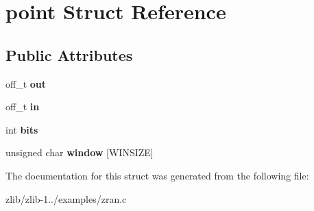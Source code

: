 \hypertarget{structpoint}{\section{point Struct Reference}
\label{structpoint}
}
\subsection*{Public Attributes}
\begin{DoxyCompactItemize}
\item 
\hypertarget{structpoint_abcfd4d3772b23166cd062d3d266c136d}{off\+\_\+t {\bfseries out}}\label{structpoint_abcfd4d3772b23166cd062d3d266c136d}

\item 
\hypertarget{structpoint_a16081c689cb453c89d844ffc88a7a211}{off\+\_\+t {\bfseries in}}\label{structpoint_a16081c689cb453c89d844ffc88a7a211}

\item 
\hypertarget{structpoint_ab8eed5134882b57585186317509c108d}{int {\bfseries bits}}\label{structpoint_ab8eed5134882b57585186317509c108d}

\item 
\hypertarget{structpoint_aa1c1ccf66b12d06cde6a14510ed2e6d6}{unsigned char {\bfseries window} \mbox{[}W\+I\+N\+S\+I\+Z\+E\mbox{]}}\label{structpoint_aa1c1ccf66b12d06cde6a14510ed2e6d6}

\end{DoxyCompactItemize}


The documentation for this struct was generated from the following file\+:\begin{DoxyCompactItemize}
\item 
zlib/zlib-\/1../examples/zran.\+c\end{DoxyCompactItemize}
